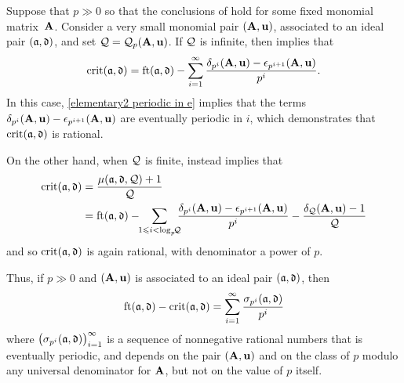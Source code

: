 \documentclass{amsart}
\begin{document}
Suppose that $p \gg 0$ so that the conclusions of  hold for some fixed monomial matrix~$\mathbf{A}$.
Consider a very small monomial pair $(\mathbf{A},\mathbf{u})$, associated to an ideal pair $(\mathfrak{a},\mathfrak{d})$, and set $\mathcal{Q} = \mathcal{Q}_p(\mathbf{A},\mathbf{u})$.
If $\mathcal{Q}$ is infinite, then   implies that
\begin{equation}\label{eq: crit infinite case}
\operatorname{crit}(\mathfrak{a},\mathfrak{d})=\operatorname{ft}(\mathfrak{a}, \mathfrak{d}) - \sum_{i=1}^{\infty} \frac{\delta_{p^i}(\mathbf{A},\mathbf{u})-\epsilon_{p^{i+1}}(\mathbf{A},\mathbf{u})}{p^i}.
\end{equation}
In this case, \eqref{elementary2 periodic in e} implies that the terms $\delta_{p^i}(\mathbf{A},\mathbf{u})-\epsilon_{p^{i+1}}(\mathbf{A},\mathbf{u})$ are eventually periodic in $i$, which demonstrates that $\operatorname{crit}(\mathfrak{a},\mathfrak{d})$ is rational.

On the other hand, when $\mathcal{Q}$ is finite,  instead implies that
\begin{align*}
\operatorname{crit}(\mathfrak{a},\mathfrak{d})& = \frac{\mu(\mathfrak{a},\mathfrak{d}, \mathcal{Q}) +1}{\mathcal{Q}} \\
& = \operatorname{ft}(\mathfrak{a}, \mathfrak{d}) -  \!\! \sum_{1 \leqslant i < \log_p\!\! \mathcal{Q}} \!\!\! \frac{\delta_{p^i}(\mathbf{A},\mathbf{u})-\epsilon_{p^{i+1}}(\mathbf{A},\mathbf{u})}{p^i} -  \frac{ \delta_{\mathcal{Q}}(\mathbf{A},\mathbf{u})-1}{\mathcal{Q}}
\end{align*}
and so $\operatorname{crit}(\mathfrak{a},\mathfrak{d})$ is again rational, with denominator a power of $p$.

Thus, if $p \gg 0$ and $(\mathbf{A},\mathbf{u})$ is associated to an ideal pair $(\mathfrak{a}, \mathfrak{d})$, then
\[ \operatorname{ft}(\mathfrak{a}, \mathfrak{d}) - \operatorname{crit}(\mathfrak{a}, \mathfrak{d}) = \sum_{i=1}^{\infty} \frac{ \sigma_{p^i}(\mathfrak{a},\mathfrak{d})}{p^i} \]
where $\big(\sigma_{p^i}(\mathfrak{a},\mathfrak{d}) \big)_{i=1}^{\infty}$ is a sequence of nonnegative rational numbers that is eventually periodic, and depends on the pair $(\mathbf{A},\mathbf{u})$ and on the class of $p$ modulo any universal denominator for $\mathbf{A}$, but not on the value of $p$ itself.
\end{document}
